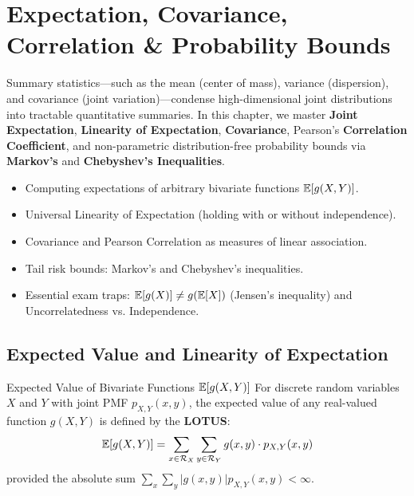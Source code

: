 \chapter{Expectation, Covariance, Correlation \& Probability Bounds}

Summary statistics---such as the mean (center of mass), variance (dispersion), and covariance (joint variation)---condense high-dimensional joint distributions into tractable quantitative summaries. In this chapter, we master \textbf{Joint Expectation}, \textbf{Linearity of Expectation}, \textbf{Covariance}, Pearson's \textbf{Correlation Coefficient}, and non-parametric distribution-free probability bounds via \textbf{Markov's} and \textbf{Chebyshev's Inequalities}.

\vspace{0.5cm}
\begin{tcolorbox}[colback=primarylight, colframe=primarydark, title={\textbf{What You'll Learn in this Chapter}}]
\begin{itemize}
    \item Computing expectations of arbitrary bivariate functions $\mathbb{E}[g(X, Y)]$.
    \item Universal Linearity of Expectation (holding with or without independence).
    \item Covariance and Pearson Correlation as measures of linear association.
    \item Tail risk bounds: Markov's and Chebyshev's inequalities.
    \item Essential exam traps: $\mathbb{E}[g(X)] \neq g(\mathbb{E}[X])$ (Jensen's inequality) and Uncorrelatedness vs. Independence.
\end{itemize}
\end{tcolorbox}

\section{Expected Value and Linearity of Expectation}

\begin{definitionbox}{Expected Value of Bivariate Functions $\mathbb{E}[g(X, Y)]$}
For discrete random variables $X$ and $Y$ with joint PMF $p_{X,Y}(x, y)$, the expected value of any real-valued function $g(X, Y)$ is defined by the \textbf{LOTUS}:
$$\mathbb{E}[g(X, Y)] = \sum_{x \in \mathcal{R}_X} \sum_{y \in \mathcal{R}_Y} g(x, y) \cdot p_{X,Y}(x, y)$$
provided the absolute sum $\sum_x \sum_y |g(x, y)| p_{X,Y}(x, y) < \infty$.
\end{definitionbox}

